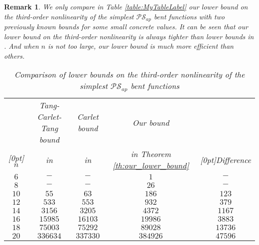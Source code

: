 \documentclass{article}
\newcommand{\0}{\textbf{0}}
\newcommand{\1}{\textbf{1}}
\theoremstyle{plain}
\newtheorem{remark}{Remark}
\begin{document}
    \begin{remark}
        \newcommand{\rb}[1]{\raisebox{1.5ex}[0pt]{#1}}
        We only compare in Table \ref{table:MyTableLabel} our lower bound on the third-order nonlinearity of the simplest $\mathcal{PS}_{ap}$ bent functions with two previously known bounds for some small concrete values.
        It can be seen that our lower bound on the third-order nonlinearity is always tighter than lower bounds in \cite{TangCT2013NL_2bent,Carlet2011NL_Profile_Dillon}.
        And when $n$ is not too large, our lower bound is much more efficient than others.
        \begin{table}
            \centering
            \caption{Comparison of lower bounds on the third-order nonlinearity of the simplest $\mathcal{PS}_{ap}$ bent functions}
            \begin{threeparttable}
                \begin{tabular}{|c|c|c|c|c|}
                    \hline
                            & Tang-Carlet-Tang bound      & Carlet bound                            & Our bound& \\
                    \rb{$n$}& in \cite{TangCT2013NL_2bent}& in \cite{Carlet2011NL_Profile_Dillon} & in Theorem \ref{th:our_lower_bound}     &\rb{Difference\tnote{1}}   \\
                    \hline
                    $6  $ &  $ -           $       & $ -        $     & $ 1        $     & $  -       $ \\  \hline
                    $8  $ &  $ -           $       & $ -        $     & $ 26       $     & $  -       $ \\  \hline
                    $10 $ &  $ 55          $       & $ 63       $     & $ 186      $     & $  123     $ \\  \hline
                    $12 $ &  $ 533         $       & $ 553      $     & $ 932      $     & $  379     $ \\  \hline
                    $14 $ &  $ 3156        $       & $ 3205     $     & $ 4372     $     & $  1167    $ \\  \hline
                    $16 $ &  $ 15985       $       & $ 16103    $     & $ 19986    $     & $  3883    $ \\  \hline
                    $18 $ &  $ 75003       $       & $ 75292    $     & $ 89028    $     & $  13736   $ \\  \hline
                    $20 $ &  $ 336634      $       & $ 337330   $     & $ 384926   $     & $  47596   $ \\  \hline

\end{tabular}
\end{threeparttable}
\end{table}
\end{remark}
\end{document}
